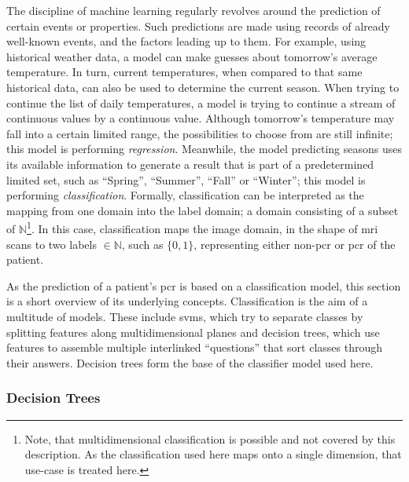 The discipline of machine learning regularly revolves around the prediction of 
certain events or properties. Such predictions are made using records of already
well-known events, and the factors leading up to them. For example, using 
historical weather data, a model can make guesses about tomorrow's average
temperature. In turn, current temperatures, when compared to that same 
historical data, can also be used to determine the current season. When trying to
continue the list of daily temperatures, a model is trying to continue a 
stream of continuous values by a continuous value. Although tomorrow's 
temperature may fall into a certain limited range, the possibilities to choose
from are still infinite; this model is performing \textit{regression}.
Meanwhile, the model predicting seasons uses its available information to 
generate a result that is part of a predetermined limited set, such as 
\enquote{Spring}, \enquote{Summer}, \enquote{Fall} or \enquote{Winter}; this 
model is performing \textit{classification}. %
Formally, classification can be interpreted as the mapping from one domain into 
the label domain; a domain consisting of a subset of $ \mathbb{N} $\footnote{Note, that multidimensional classification is possible and not covered by this description. As the classification used here maps onto a single dimension, that use-case is treated here.}. In this case,
classification maps the image domain, in the shape of \ac{mri} scans to two 
labels $\in \mathbb{N} $, such as $\{0, 1\}$, representing either non-\acs{pcr}
or \ac{pcr} of the patient. 

As the prediction of a patient's
\ac{pcr} is based on a classification model, this section is a short overview
of its underlying concepts. Classification is the aim of a multitude of models. These include \acp{svm}, 
which try to separate classes by splitting features along multidimensional 
planes and decision trees, which use features to assemble multiple interlinked
\enquote{questions} that sort classes through their answers. Decision trees 
form the base of the classifier model used here.

\subsubsection{Decision Trees}

